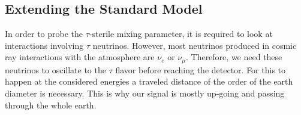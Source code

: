 \subsection{Extending the Standard Model}

In order to probe the $\tau$-sterile mixing parameter, it is required to look at interactions involving $\tau$ neutrinos. However, most neutrinos produced in cosmic ray interactions with the atmosphere are $\nu_{e}$ or $\nu_{\mu}$. Therefore, we need these neutrinos to oscillate to the $\tau$ flavor before reaching the detector. For this to happen at the considered energies a traveled distance of the order of the earth diameter is necessary. This is why our signal is mostly up-going and passing through the whole earth.

